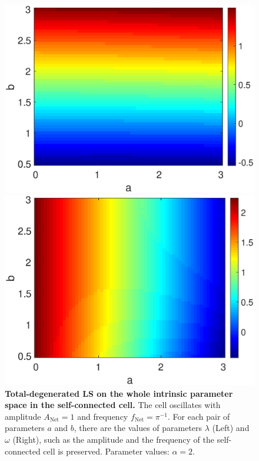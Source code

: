   \begin{figure}[h]
  \centering
        \begin{minipage}{0.4\linewidth}
            \begin{center}
                \includegraphics[width=1\linewidth]{Images/photo15_1.eps}
            \end{center}
        \end{minipage} 
        \begin{minipage}{0.4\linewidth}
            \begin{center}
                \includegraphics[width=1\linewidth]{Images/photo15_2.eps}
            \end{center}
        \end{minipage} 
  
  \caption{\textbf{Total-degenerated LS on the whole intrinsic parameter space in the self-connected cell.} The cell oscillates with amplitude $A_{\text{Net}} = 1$ and frequency $f_{\text{Net}} = \pi^{-1}$. For each pair of parameters $a$ and $b$, there are the values of parameters $\lambda$ (Left) and $\omega$ (Right), such as the amplitude and the frequency of the self-connected cell is preserved. Parameter values: $\alpha = 2$.}
  \label{photo15}
\end{figure}

